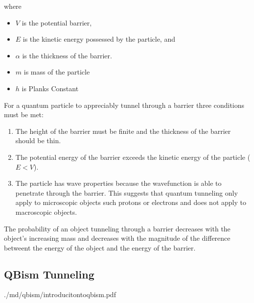 \documentclass[]{article}
\begin{document}
where
\begin{itemize}
\item $V$ is the potential barrier,
\item $E$ is the kinetic energy possessed by the particle, and
\item $\alpha$ is the thickness of the barrier.
\item $m$ is mass of the particle
\item $h$ is Planks Constant\\
\end{itemize}

For a quantum particle to appreciably tunnel through a barrier three conditions must be met:
\begin{enumerate}
\item The height of the barrier must be finite and the thickness of the barrier should be thin.
\item The potential energy of the barrier exceeds the kinetic energy of the particle ($E<V$). 
\item The particle has wave properties because the wavefunction is able to penetrate through the barrier. This suggests that quantum tunneling only apply to microscopic objects such protons or electrons and does not apply to macroscopic objects.
\end{enumerate}

The probability of an object tunneling through a barrier decreases with the object's increasing mass and decreases with the magnitude of the difference betweent the energy of the object and the energy of the barrier.

\subsection*{QBism Tunneling}
./md/qbism/introducitontoqbism.pdf
\end{document}
